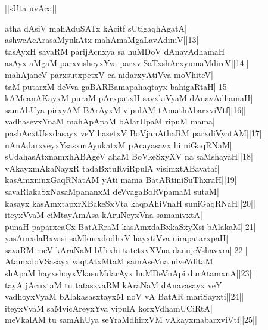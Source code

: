 \documentclass{article}
\begin{document}
\begin{center}
||sUta uvAca||
\end{center}

atha dAsiV mahAduSATx kAcitf sUtigaqhAgatA|\\
ashwcAcArasaMyukAtx mahAmaMgaLavAdiniV||13||\\
tasAyxH savaRM parijAcnxya sa huMDoV dAnavAdhamaH\\
asAyx aMgaM parxvisheyxYva parxviSaTxshAcxyumaMdireV||14||\\
mahAjaneV parxsutxpetxV ca nidarxyAtiVva moVhiteV|\\
taM putarxM deVva gaBARBamapahaqtayx bahigaRtaH||15||\\
kAMcanAKayxM puraM pArxpatxH savxkiVyaM dAnavAdhamaH|\\
samAhUya pirxyAM BArAyxM vipulAM tAmathAbarxviVtf||16||\\
vadhasevxYnaM mahApApaM bAlarUpaM ripuM mama|\\
pashAcxtUsxdasayx veY hasetxV BoVjanAthaRM parxdiVyatAM||17||\\
nAnAdarxveyxYsasxmAyukatxM pAcayasavx hi niGaqRNaM|\\
sUdahasAtxnamxhABAgeV ahaM BoVkeSxyXV na saMshayaH||18||\\
vAkayxmAkaNayxR tadaBxtuRviRpulA visimxtABavataf|\\
kasAmxninxGaqRNatAM yAti mama BatARtiniSuThxraH||19||\\
savaRlakaSxNasaMpananxM deVvagaBoRVpamaM sutaM|\\
kasayx kasAmxtapxrXBakeSxVta kaqpAhiVnaH suniGaqRNaH||20||\\
iteyxVvaM ciMtayAmAsa kAruNeyxVna samanivxtA|\\
punaH paparxcaCx BatARraM kasAmxdaBxkaSxyXsi bAlakaM||21||\\
yasAmxdaBxvasi saMkurxdodhxV hayxtiVva nirapatarxpaH|\\
savaRM meV kAraNaM bUrxhi tatetxvXVna danujeVshavxra||22||\\
AtamxdoVSasayx vaqtAtxMtaM samAseVna niveVditaM|\\
shApaM hayxshoyxVkasuMdarAyx huMDeVnApi durAtamxnA||23||\\
tayA jAcnxtaM tu tatasxvaRM kAraNaM dAnavasayx veY|\\
vadhoyxVyaM bAlakasasxtayxM noV vA BatAR mariSayxti||24||\\
iteyxVvaM saMvicAreyxYva vipulA korxVdhamUCiRtA|\\
meVkalAM tu samAhUya seYraMdhirxVM vAkayxmabarxviVtf||25||\\
\end{document}
